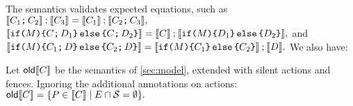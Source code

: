 The semantics validates expected equations, such as
\begin{math}
  \sem{\aCmd_1\SEMI\aCmd_2}\sequence\sem{\aCmd_3} =
  \sem{\aCmd_1}\sequence\sem{\aCmd_2\SEMI\aCmd_3},
\end{math}
\begin{math}
  \sem{\IF{\aExp} \THEN \aCmd \SEMI\bCmd_1\ELSE \aCmd\SEMI\bCmd_2\FI} =
  \sem{\aCmd}\sequence\sem{\IF{\aExp} \THEN \bCmd_1 \ELSE \bCmd_2\FI},
\end{math}
and
\begin{math}
  \sem{\IF{\aExp} \THEN \aCmd_1 \SEMI\bCmd\ELSE\allowbreak \aCmd_2\SEMI\bCmd\FI} =
  \sem{\IF{\aExp} \THEN \aCmd_1 \ELSE \aCmd_2\FI}\sequence\sem{\bCmd}.
\end{math}
We also have:
\begin{theorem}
  \label{thm:seq}
Let $\semold{\aCmd}$ be the semantics of \textsection\ref{sec:model},
extended with silent actions and fences.  Ignoring the additional annotations
on actions:
\begin{math}
  \semold{\aCmd} = \{ \aPS\in\sem{\aCmd} \mid \disjoint{\Event}{\Sub}\}.
\end{math}
\end{theorem}


